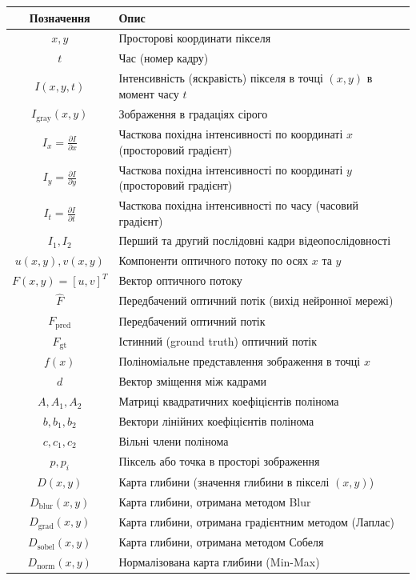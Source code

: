 \documentclass[14pt, a4paper]{extarticle}
\numberwithin{equation}{section}
\begin{document}
\begin{longtable}{|c|l|}
\hline
\textbf{Позначення} & \textbf{Опис} \\
\hline
$x, y$ & Просторові координати пікселя \\
$t$ & Час (номер кадру) \\
$I(x,y,t)$ & Інтенсивність (яскравість) пікселя в точці $(x,y)$ в момент часу $t$ \\
$I_{\text{gray}}(x,y)$ & Зображення в градаціях сірого \\
$I_x = \frac{\partial I}{\partial x}$ & Часткова похідна інтенсивності по координаті $x$ (просторовий градієнт) \\
$I_y = \frac{\partial I}{\partial y}$ & Часткова похідна інтенсивності по координаті $y$ (просторовий градієнт) \\
$I_t = \frac{\partial I}{\partial t}$ & Часткова похідна інтенсивності по часу (часовий градієнт) \\
$I_1, I_2$ & Перший та другий послідовні кадри відеопослідовності \\
$u(x,y), v(x,y)$ & Компоненти оптичного потоку по осях $x$ та $y$ \\
$F(x,y) = [u, v]^T$ & Вектор оптичного потоку \\
$\hat{F}$ & Передбачений оптичний потік (вихід нейронної мережі) \\
$F_{\text{pred}}$ & Передбачений оптичний потік \\
$F_{\text{gt}}$ & Істинний (ground truth) оптичний потік \\
$f(x)$ & Поліноміальне представлення зображення в точці $x$ \\
$d$ & Вектор зміщення між кадрами \\
$A, A_1, A_2$ & Матриці квадратичних коефіцієнтів полінома \\
$b, b_1, b_2$ & Вектори лінійних коефіцієнтів полінома \\
$c, c_1, c_2$ & Вільні члени полінома \\
$p, p_i$ & Піксель або точка в просторі зображення \\
$D(x,y)$ & Карта глибини (значення глибини в пікселі $(x,y)$) \\
$D_{\text{blur}}(x,y)$ & Карта глибини, отримана методом Blur \\
$D_{\text{grad}}(x,y)$ & Карта глибини, отримана градієнтним методом (Лаплас) \\
$D_{\text{sobel}}(x,y)$ & Карта глибини, отримана методом Собеля \\
$D_{\text{norm}}(x,y)$ & Нормалізована карта глибини (Min-Max) \\

\end{longtable}
\end{document}

